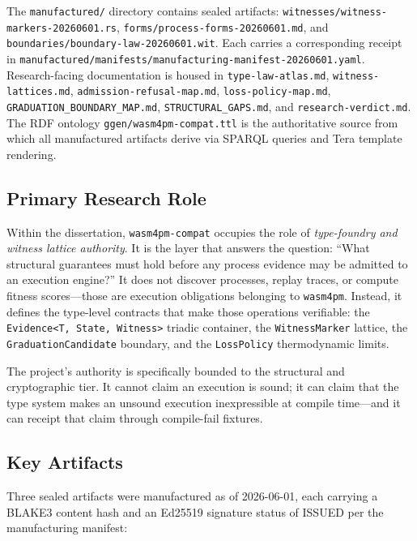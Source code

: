 The \texttt{manufactured/} directory contains sealed artifacts: \texttt{witnesses/witness-markers-20260601.rs},
\texttt{forms/process-forms-20260601.md}, and \texttt{boundaries/boundary-law-20260601.wit}.
Each carries a corresponding receipt in \texttt{manufactured/manifests/manufacturing-manifest-20260601.yaml}.
Research-facing documentation is housed in \texttt{type-law-atlas.md}, \texttt{witness-lattices.md},
\texttt{admission-refusal-map.md}, \texttt{loss-policy-map.md}, \texttt{GRADUATION\_BOUNDARY\_MAP.md},
\texttt{STRUCTURAL\_GAPS.md}, and \texttt{research-verdict.md}. The RDF ontology
\texttt{ggen/wasm4pm-compat.ttl} is the authoritative source from which all manufactured artifacts
derive via SPARQL queries and Tera template rendering.

\subsection{Primary Research Role}
\label{sec:sources-wasm4pm-compat-identity-role}

Within the dissertation, \texttt{wasm4pm-compat} occupies the role of
\emph{type-foundry and witness lattice authority}. It is the layer that answers the question:
``What structural guarantees must hold before any process evidence may be admitted to an
execution engine?'' It does not discover processes, replay traces, or compute fitness scores---those
are execution obligations belonging to \texttt{wasm4pm}. Instead, it defines the
type-level contracts that make those operations verifiable: the \texttt{Evidence<T, State, Witness>}
triadic container, the \texttt{WitnessMarker} lattice, the \texttt{GraduationCandidate} boundary,
and the \texttt{LossPolicy} thermodynamic limits.

The project's authority is specifically bounded to the structural and cryptographic tier.
It cannot claim an execution is sound; it can claim that the type system makes an unsound
execution inexpressible at compile time---and it can receipt that claim through compile-fail
fixtures.

\subsection{Key Artifacts}
\label{sec:sources-wasm4pm-compat-identity-artifacts}

Three sealed artifacts were manufactured as of 2026-06-01, each carrying a BLAKE3 content
hash and an Ed25519 signature status of ISSUED per the manufacturing manifest:

